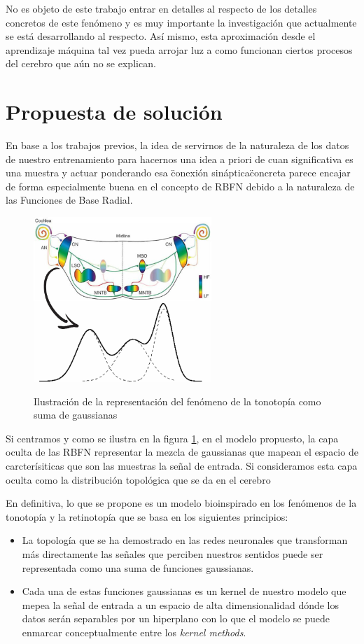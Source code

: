 \documentclass[10pt,a4paper]{report}
\begin{document}
No es objeto de este trabajo entrar en detalles al respecto de los detalles concretos de este fenómeno y es muy importante la investigación que actualmente se está desarrollando al respecto. Así mismo, esta aproximación desde el aprendizaje máquina tal vez pueda arrojar luz a como funcionan ciertos procesos del cerebro que aún no se explican.

\section{Propuesta de solución}
En base a los trabajos previos, la idea de servirnos de la naturaleza de los datos de nuestro entrenamiento para hacernos una idea a priori de cuan significativa es una muestra y actuar ponderando esa \"conexión sináptica\" concreta parece encajar de forma especialmente buena en el concepto de RBFN debido a la naturaleza de las Funciones de Base Radial. 

\begin{figure}[hb!]{}
    \centering
    \includegraphics[width=0.6\textwidth]{img/esquemaPropuesta1.jpg}
    \label{fig:Esquemapropuesta1}
    \caption{Ilustración de la representación del fenómeno de la tonotopía como suma de gaussianas}
\end{figure}

Si centramos y como se ilustra en la figura \ref{fig:Esquemapropuesta1}, en el modelo propuesto, la capa oculta de las RBFN representar la mezcla de gaussianas que mapean el espacio de carcterísiticas que son las muestras la señal de entrada. Si consideramos esta capa oculta como la distribución topológica que se da en el cerebro


En definitiva, lo que se propone es un modelo bioinspirado en los fenómenos de la tonotopía y la retinotopía que se basa en los siguientes principios:
\begin{itemize}
	\item La topología que se ha demostrado en las redes neuronales que transforman más directamente las señales que perciben nuestros sentidos puede ser representada como una suma de funciones gaussianas.
	\item Cada una de estas funciones gaussianas es un kernel de nuestro modelo que mepea la señal de entrada a un espacio de alta dimensionalidad dónde los datos serán separables por un hiperplano con lo que el modelo se puede enmarcar conceptualmente entre los \textit{kernel methods}.
\end{itemize}
\end{document}
